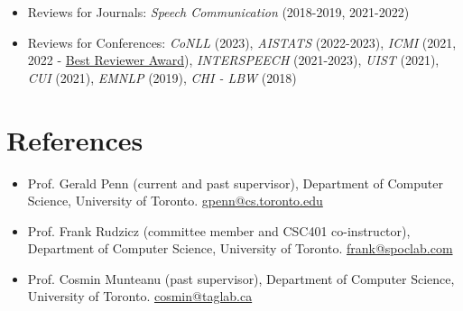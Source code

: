 \documentclass{article}
\begin{document}
\begin{itemize}
  \item Reviews for Journals:%
    \textit{Speech Communication} (2018-2019, 2021-2022)
  \item Reviews for Conferences:%
    \textit{CoNLL} (2023),%
    \textit{AISTATS} (2022-2023),%
    \textit{ICMI} (2021, 2022 - \href{https://icmi.acm.org/2022/awards/}{Best Reviewer Award}),%
    \textit{INTERSPEECH} (2021-2023),%
    \textit{UIST} (2021),%
    \textit{CUI} (2021),%
    \textit{EMNLP} (2019),%
    \textit{CHI - LBW} (2018)%
\end{itemize}

\section{References}

\begin{itemize}
  \item Prof. Gerald Penn (current and past supervisor), Department of
    Computer Science, University of Toronto.
    \href{mailto:gpenn@cs.toronto.edu}{gpenn@cs.toronto.edu}
  \item Prof. Frank Rudzicz (committee member and CSC401 co-instructor),
    Department of Computer Science, University of Toronto.
    \href{mailto:frank@spoclab.com}{frank@spoclab.com}
  \item Prof. Cosmin Munteanu (past supervisor), Department of Computer Science,
    University of Toronto. \href{mailto:cosmin@taglab.ca}{cosmin@taglab.ca}
\end{itemize}
\end{document}
